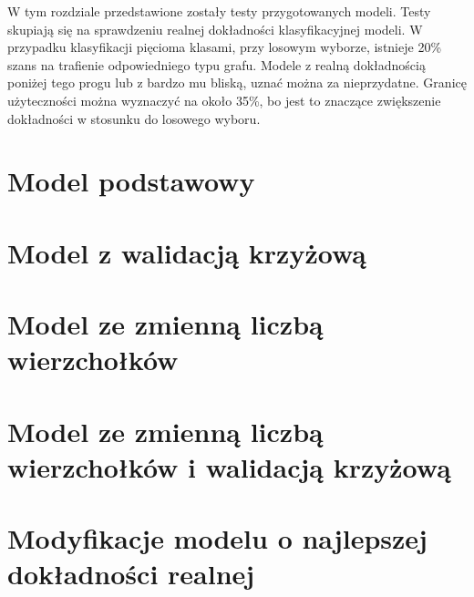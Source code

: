W tym rozdziale przedstawione zostały testy przygotowanych modeli.
Testy skupiają się na sprawdzeniu realnej dokładności klasyfikacyjnej modeli.
W przypadku klasyfikacji pięcioma klasami, przy losowym wyborze, istnieje 20\% szans na trafienie odpowiedniego typu grafu.
Modele z realną dokładnością poniżej tego progu lub z bardzo mu bliską, uznać można za nieprzydatne.
Granicę użyteczności można wyznaczyć na około 35\%, bo jest to znaczące zwiększenie dokładności w stosunku do losowego wyboru.

\section{Model podstawowy}


\section{Model z walidacją krzyżową}


\section{Model ze zmienną liczbą wierzchołków}


\section{Model ze zmienną liczbą wierzchołków i walidacją krzyżową}


\section{Modyfikacje modelu o najlepszej dokładności realnej}
